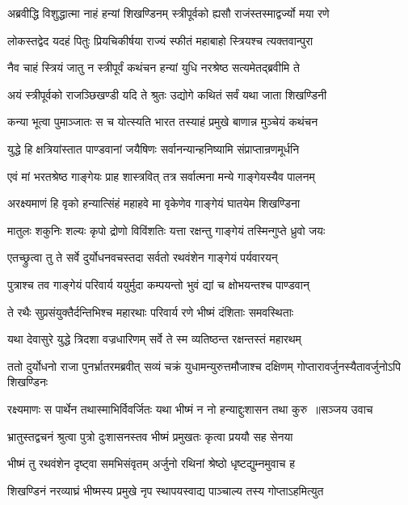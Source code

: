 \twolineshloka
{अब्रवीद्धि विशुद्धात्मा नाहं हन्यां शिखण्डिनम्}
{स्त्रीपूर्वको ह्यसौ राजंस्तस्माद्वर्ज्यो मया रणे}


\twolineshloka
{लोकस्तद्वेद यदहं पितुः प्रियचिकीर्षया}
{राज्यं स्फीतं महाबाहो स्त्रियश्च त्यक्तवान्पुरा}


\twolineshloka
{नैव चाहं स्त्रियं जातु न स्त्रीपूर्वं कथंचन}
{हन्यां युधि नरश्रेष्ठ सत्यमेतद्ब्रवीमि ते}


\twolineshloka
{अयं स्त्रीपूर्वको राजञ्छिखण्डी यदि ते श्रुतः}
{उद्योगे कथितं सर्वं यथा जाता शिखण्डिनी}


\twolineshloka
{कन्या भूत्वा पुमाञ्जातः स च योत्स्यति भारत}
{तस्याहं प्रमुखे बाणान्न मुञ्चेयं कथंचन}


\twolineshloka
{युद्धे हि क्षत्रियांस्तात पाण्डवानां जयैषिणः}
{सर्वानन्यान्हनिष्यामि संप्राप्तान्रणमूर्धनि}


\twolineshloka
{एवं मां भरतश्रेष्ठ गाङ्गेयः प्राह शास्त्रवित्}
{तत्र सर्वात्मना मन्ये गाङ्गेयस्यैव पालनम्}


\twolineshloka
{अरक्ष्यमाणं हि वृको हन्यात्सिंहं महाहवे}
{मा वृकेणेव गाङ्गेयं घातयेम शिखण्डिना}


\twolineshloka
{मातुलः शकुनिः शल्यः कृपो द्रोणो विविंशतिः}
{यत्ता रक्षन्तु गाङ्गेयं तस्मिन्गुप्ते ध्रुवो जयः}


\twolineshloka
{एतच्छ्रुत्वा तु ते सर्वे दुर्योधनवचस्तदा}
{सर्वतो रथवंशेन गाङ्गेयं पर्यवारयन्}


\twolineshloka
{पुत्राश्च तव गाङ्गेयं परिवार्य ययुर्मुदा}
{कम्पयन्तो भुवं द्यां च क्षोभयन्तश्च पाण्डवान्}


\twolineshloka
{ते रथैः सुप्रसंयुक्तैर्दन्तिभिश्च महारथाः}
{परिवार्य रणे भीष्मं दंशिताः समवस्थिताः}


\twolineshloka
{यथा देवासुरे युद्धे त्रिदशा वज्रधारिणम्}
{सर्वे ते स्म व्यतिष्ठन्त रक्षन्तस्तं महारथम्}


\threelineshloka
{ततो दुर्योधनो राजा पुनर्भ्रातरमब्रवीत्}
{सव्यं चक्रं युधामन्युरुत्तमौजाश्च दक्षिणम्}
{गोप्तारावर्जुनस्यैतावर्जुनोऽपि शिखण्डिनः}


\threelineshloka
{रक्ष्यमाणः स पार्थेन तथास्माभिर्विवर्जितः}
{यथा भीष्मं न नो हन्याद्दुःशासन तथा कुरु ॥सञ्जय उवाच}
{}


\twolineshloka
{भ्रातुस्तद्वचनं श्रुत्वा पुत्रो दुःशासनस्तव}
{भीष्मं प्रमुखतः कृत्वा प्रययौ सह सेनया}


\twolineshloka
{भीष्मं तु रथवंशेन दृष्ट्वा समभिसंवृतम्}
{अर्जुनो रथिनां श्रेष्ठो धृष्टद्युम्नमुवाच ह}


\twolineshloka
{शिखण्डिनं नरव्याघ्रं भीष्मस्य प्रमुखे नृप}
{स्थापयस्वाद्य पाञ्चाल्य तस्य गोप्ताऽहमित्युत}


